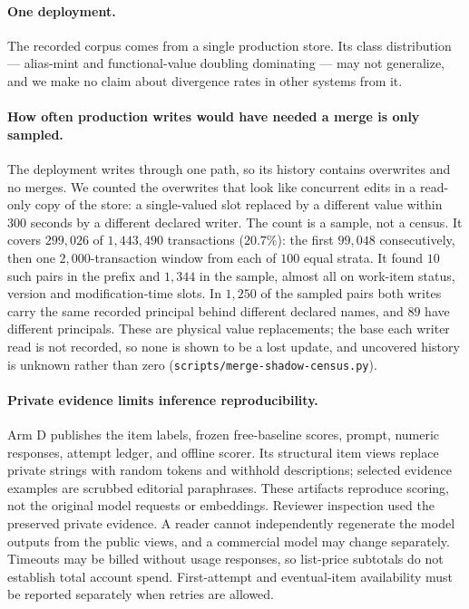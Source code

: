\paragraph{One deployment.} The recorded corpus comes from a single production
store. Its class distribution --- alias-mint and functional-value doubling
dominating --- may not generalize, and we make no claim about divergence rates
in other systems from it.

\paragraph{How often production writes would have needed a merge is only sampled.}
The deployment writes through one path, so its history contains overwrites and
no merges. We counted the overwrites that look like concurrent edits in a
read-only copy of the store: a single-valued slot replaced by a different value
within $300$ seconds by a different declared writer. The count is a sample, not
a census. It covers $299{,}026$ of $1{,}443{,}490$ transactions ($20.7\%$): the
first $99{,}048$ consecutively, then one $2{,}000$-transaction window from each
of $100$ equal strata. It found $10$ such pairs in the prefix and $1{,}344$ in
the sample, almost all on work-item status, version and modification-time
slots. In $1{,}250$ of the sampled pairs both writes carry the same recorded
principal behind different declared names, and $89$ have different principals.
These are physical value replacements; the base each writer read is not
recorded, so none is shown to be a lost update, and uncovered history is
unknown rather than zero (\texttt{scripts/merge-shadow-census.py}).

\paragraph{Private evidence limits inference reproducibility.}
Arm D publishes the item labels, frozen free-baseline scores, prompt, numeric
responses, attempt ledger, and offline scorer. Its structural item views replace
private strings with random tokens and withhold descriptions; selected evidence
examples are scrubbed editorial paraphrases. These artifacts reproduce scoring,
not the original model requests or embeddings. Reviewer inspection used the
preserved private evidence. A reader cannot independently regenerate the model
outputs from the public views, and a commercial model may change separately.
Timeouts may be billed without usage responses, so list-price subtotals do not
establish total account spend. First-attempt and eventual-item availability
must be reported separately when retries are allowed.
